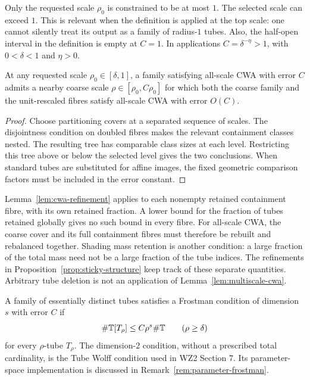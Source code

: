 \begin{remark}
\label{rem:nearby-scale}
Only the requested scale $\rho_0$ is constrained to be at most $1$.
The selected scale can exceed $1$. This is relevant when the definition
is applied at the top scale: one cannot silently treat its output as
a family of radius-$1$ tubes. Also, the half-open interval in the
definition is empty at $C=1$. In applications $C=\delta^{-\eta}>1$,
with $0<\delta<1$ and $\eta>0$.
\end{remark}

\begin{lemma}
\label{lem:multiscale-cwa}
At any requested scale $\rho_0\in[\delta,1]$, a family satisfying
all-scale CWA with error $C$ admits a nearby coarse scale
$\rho\in[\rho_0,C\rho_0]$ for which both the coarse family and the
unit-rescaled fibres satisfy all-scale CWA with error $O(C)$.
\end{lemma}
\begin{proof}
Choose partitioning covers at a separated sequence of scales. The
disjointness condition on doubled fibres makes the relevant containment
classes nested. The resulting tree has comparable class sizes at each
level. Restricting this tree above or below the selected level gives
the two conclusions. When standard tubes are substituted for affine
images, the fixed geometric comparison factors must be included in
the error constant.
\end{proof}

\begin{remark}
\label{rem:refinement-loss}
Lemma~\ref{lem:cwa-refinement} applies to each nonempty retained
containment fibre, with its own retained fraction. A lower bound for
the fraction of tubes retained globally gives no such bound in every
fibre. For all-scale CWA, the coarse cover and its full containment
fibres must therefore be rebuilt and rebalanced together. Shading
mass retention is another condition: a large fraction of the total
mass need not be a large fraction of the tube indices.
The refinements in Proposition~\ref{prop:sticky-structure} keep track
of these separate quantities. Arbitrary tube deletion is not an
application of Lemma~\ref{lem:multiscale-cwa}.
\end{remark}

\begin{definition}
\label{def:tube-frostman}
A family of essentially distinct tubes satisfies a Frostman condition
of dimension $s$ with error $C$ if
\[
 \#\mathbb{T}[T_\rho]\leq C\rho^s\#\mathbb{T}
 \qquad(\rho\geq\delta)
\]
for every $\rho$-tube $T_\rho$. The dimension-$2$ condition, without a
prescribed total cardinality, is the Tube Wolff condition used in WZ2
Section 7. Its parameter-space implementation is discussed in
Remark~\ref{rem:parameter-frostman}.
\end{definition}

